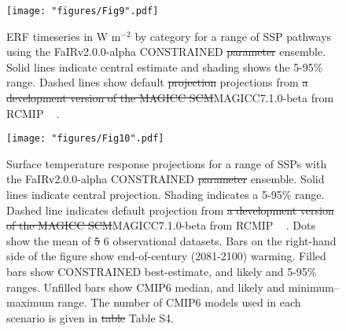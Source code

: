 \documentclass[gmd, manuscript]{copernicus}
\providecommand{\DIFadd}[1]{{\protect\color{blue}#1}} %
\providecommand{\DIFdel}[1]{{\protect\color{red}\sout{#1}}}                      %
\providecommand{\DIFaddend}{} %
\providecommand{\DIFdelbegin}{} %
\providecommand{\DIFdelend}{} %
\providecommand{\DIFaddFL}[1]{\DIFadd{#1}} %
\providecommand{\DIFdelFL}[1]{\DIFdel{#1}} %
\providecommand{\DIFaddbeginFL}{} %
\providecommand{\DIFaddendFL}{} %
\providecommand{\DIFdelbeginFL}{} %
\providecommand{\DIFdelendFL}{} %
\begin{document}
\clearpage
\DIFaddend \begin{figure}[t]
    \DIFdelbeginFL %
\DIFdelendFL \DIFaddbeginFL \texttt{[image: "figures/Fig9".pdf]}
    \DIFaddendFL \caption{ERF timeseries \DIFaddbeginFL \DIFaddFL{in W m$^{-2}$ }\DIFaddendFL by category for a range of SSP pathways using the \DIFaddbeginFL \DIFaddFL{FaIRv2.0.0-alpha }\DIFaddendFL CONSTRAINED \DIFdelbeginFL \DIFdelFL{parameter }\DIFdelendFL ensemble. Solid lines indicate central estimate and shading shows the 5-95\% range. Dashed lines show default \DIFdelbeginFL \DIFdelFL{projection }\DIFdelendFL \DIFaddbeginFL \DIFaddFL{projections }\DIFaddendFL from \DIFdelbeginFL \DIFdelFL{a development version of the MAGICC SCM}\DIFdelendFL \DIFaddbeginFL \DIFaddFL{MAGICC7.1.0-beta from RCMIP \mbox{%
\citep{Nicholls2019}}\hspace{0pt}%
}\DIFaddendFL .}
    \label{fig:NROY_SSP_ERF}
\end{figure}
\clearpage
%
\DIFdelbegin %
\DIFdelend \begin{figure}[t]
    \DIFdelbeginFL %
\DIFdelendFL \DIFaddbeginFL \texttt{[image: "figures/Fig10".pdf]}
    \DIFaddendFL \caption{Surface temperature response projections for a range of SSPs with the \DIFaddbeginFL \DIFaddFL{FaIRv2.0.0-alpha }\DIFaddendFL CONSTRAINED \DIFdelbeginFL \DIFdelFL{parameter }\DIFdelendFL ensemble. Solid lines indicate central projection. Shading indicates a 5-95\% range. Dashed line indicates default projection from \DIFdelbeginFL \DIFdelFL{a development version of the MAGICC SCM}\DIFdelendFL \DIFaddbeginFL \DIFaddFL{MAGICC7.1.0-beta from RCMIP \mbox{%
\citep{Nicholls2019}}\hspace{0pt}%
}\DIFaddendFL . Dots show the mean of \DIFdelbeginFL \DIFdelFL{5 }\DIFdelendFL \DIFaddbeginFL \DIFaddFL{6 }\DIFaddendFL observational datasets. Bars on the right-hand side of the figure show end-of-century (2081-2100) warming. Filled bars show CONSTRAINED best-estimate, and likely and 5-95\% ranges. Unfilled bars show CMIP6 median, and likely and minimum--maximum range. The number of CMIP6 models used in each scenario is given in \DIFdelbeginFL \DIFdelFL{table }\DIFdelendFL \DIFaddbeginFL \DIFaddFL{Table }\DIFaddendFL S4.}
    \label{fig:NROY_SSP}
\end{figure}
\clearpage
%
\end{document}
